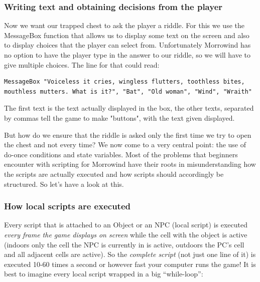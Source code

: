 \hypertarget{writing-text-and-obtaining-decisions-from-the-player}{%
\subsubsection{Writing text and obtaining decisions from the player}\label{writing-text-and-obtaining-decisions-from-the-player}}

Now we want our trapped chest to ask the player a riddle. For this we use the MessageBox function that allows us to display some text on the screen and also to display choices that the player can select from. Unfortunately Morrowind has no option to have the player type in the answer to our riddle, so we will have to give multiple choices. The line for that could read:

\begin{lstlisting}
MessageBox "Voiceless it cries, wingless flutters, toothless bites,
mouthless mutters. What is it?", "Bat", "Old woman", "Wind", "Wraith"
\end{lstlisting}

The first text is the text actually displayed in the box, the other texts, separated by commas tell the game to make "buttons", with the text given displayed.

But how do we ensure that the riddle is asked only the first time we try to open the chest and not every time? We now come to a very central point: the use of do-once conditions and state variables. Most of the problems that beginners encounter with scripting for Morrowind have their roots in misunderstanding how the scripts are actually executed and how scripts should accordingly be structured. So let's have a look at this.

\hypertarget{how-local-scripts-are-executed}{%
\subsubsection{How local scripts are
executed}\label{how-local-scripts-are-executed}}

Every script that is attached to an Object or an NPC (local script) is executed \emph{every frame the game displays on screen} while the cell with the object is active (indoors only the cell the NPC is currently in is active, outdoors the PC's cell and all adjacent cells are active). So the \emph{complete script} (not just one line of it) is executed 10-60 times a second or however fast your computer runs the game! It is best to imagine every local script wrapped in a big ``while-loop'':

